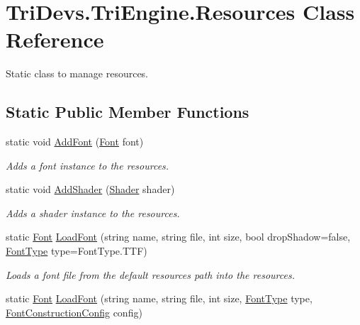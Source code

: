 \hypertarget{class_tri_devs_1_1_tri_engine_1_1_resources}{\section{Tri\-Devs.\-Tri\-Engine.\-Resources Class Reference}
\label{class_tri_devs_1_1_tri_engine_1_1_resources}
}


Static class to manage resources.  


\subsection*{Static Public Member Functions}
\begin{DoxyCompactItemize}
\item 
static void \hyperlink{class_tri_devs_1_1_tri_engine_1_1_resources_abb09cb92e22d6617dedca5e866dc381a}{Add\-Font} (\hyperlink{class_tri_devs_1_1_tri_engine_1_1_text_1_1_font}{Font} font)
\begin{DoxyCompactList}\small\item\em Adds a font instance to the resources. \end{DoxyCompactList}\item 
static void \hyperlink{class_tri_devs_1_1_tri_engine_1_1_resources_a81083cc6b02468d7a437f34bddf455d0}{Add\-Shader} (\hyperlink{class_tri_devs_1_1_tri_engine_1_1_shaders_1_1_shader}{Shader} shader)
\begin{DoxyCompactList}\small\item\em Adds a shader instance to the resources. \end{DoxyCompactList}\item 
static \hyperlink{class_tri_devs_1_1_tri_engine_1_1_text_1_1_font}{Font} \hyperlink{class_tri_devs_1_1_tri_engine_1_1_resources_a1ffcf498ae3168d7b21cd70b86ff6a29}{Load\-Font} (string name, string file, int size, bool drop\-Shadow=false, \hyperlink{namespace_tri_devs_1_1_tri_engine_1_1_text_a823573b800952d8909dc50e1efa3358b}{Font\-Type} type=Font\-Type.\-T\-T\-F)
\begin{DoxyCompactList}\small\item\em Loads a font file from the default resources path into the resources. \end{DoxyCompactList}\item 
static \hyperlink{class_tri_devs_1_1_tri_engine_1_1_text_1_1_font}{Font} \hyperlink{class_tri_devs_1_1_tri_engine_1_1_resources_acad1938bb243b8e83674084c5f8c5bcf}{Load\-Font} (string name, string file, int size, \hyperlink{namespace_tri_devs_1_1_tri_engine_1_1_text_a823573b800952d8909dc50e1efa3358b}{Font\-Type} type, \hyperlink{class_tri_devs_1_1_tri_engine_1_1_text_1_1_font_construction_config}{Font\-Construction\-Config} config)

\end{DoxyCompactItemize}
